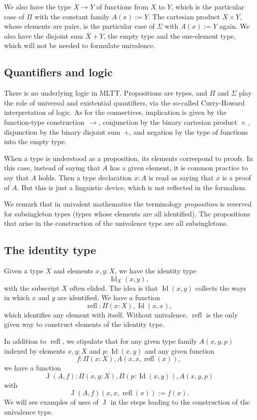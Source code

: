 \documentclass{article}
\newcommand{\Id}{\operatorname{Id}}
\newcommand{\J}{\operatorname{J}}
\newcommand{\refl}{\operatorname{refl}}
\begin{document}
We also have the type $X\to Y$ of functions from $X$ to $Y$, which is
the particular case of $\Pi$ with the constant family $A(x):=Y$.  The
cartesian product $X\times Y$, whose elements are pairs, is the
particular case of $\Sigma$ with $A(x):=Y$ again.
We also have the disjoint sum $X+Y$, the empty type and the
one-element type, which will not be needed to formulate univalence.


\subsection{Quantifiers and logic}

There is no underlying logic in MLTT. Propositions are types, and
$\Pi$ and $\Sigma$ play the role of universal and existential
quantifiers, via the so-called Curry-Howard interpretation of
logic. As for the connectives, implication is given by the
function-type construction~$\to$, conjunction by the binary cartesian
product~$\times$ , disjunction by the binary disjoint sum~$+$, and
negation by the type of functions into the empty type.

When a type is understood as a proposition, its elements correspond to
proofs.  In this case, instead of saying that $A$ has a given element,
it is common practice to say that $A$ holds. Then a type declaration
$x:A$ is read as saying that $x$ is a proof of $A$. But this is just a
linguistic device, which is not reflected in the formalism.

We remark that in univalent mathematics the terminology
\emph{proposition} is reserved for subsingleton types (types whose
elements are all identified). The propositions that arise in the
construction of the univalence type are all subsingletons.

\subsection{The identity type}

Given a type $X$ and elements $x,y:X$, we have the identity type
\[
    \Id_X(x,y),
\]
with the subscript $X$ often elided. The idea is that $\Id(x,y)$ collects
the ways in which $x$ and $y$ are identified.
%
We have a function
\[
    \refl : \Pi(x:X), \Id(x,x),
\]
which identifies any element with itself. Without univalence, $\refl$ is
the only given way to construct elements of the identity type.

In addition to $\refl$, we stipulate that for any given type family $A(x,y,p)$
indexed by elements $x,y:X$ and $p:\Id(x,y)$ and any given function
\[
    f : \Pi(x:X), A(x,x,\refl(x)),
\]
we have a function 
\[
    \J(A,f) : \Pi(x,y:X), \Pi(p:\Id(x,y)), A(x,y,p)
\]
with
\[
    \J(A,f)(x,x,\refl(x)) := f(x).
\]
We will see examples of uses of $\J$ in the steps leading to the
construction of the univalence type.
\end{document}
